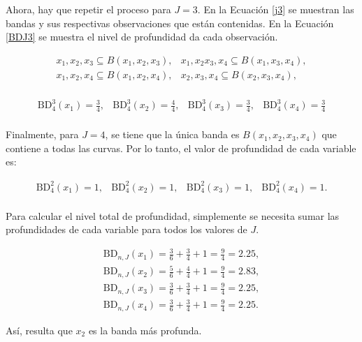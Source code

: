 \begin{ejemplo}
Ahora, hay que repetir el proceso para $J = 3$. En la Ecuación \eqref{j3} se muestran las bandas y sus respectivas observaciones que están contenidas. En la Ecuación \eqref{BDJ3} se muestra el nivel de profundidad da cada observación.

\begin{equation}\label{j3}
    \begin{matrix}
        x_1, x_2, x_3 \subseteq B(x_1, x_2, x_3), & x_1, x_2 x_3, x_4 \subseteq B(x_1, x_3, x_4), \\
        x_1, x_2, x_4 \subseteq B(x_1, x_2, x_4), & x_2, x_3, x_4 \subseteq B(x_2, x_3, x_4), \\
    \end{matrix}
\end{equation}

\begin{equation}\label{BDJ3}
    \begin{matrix}
        \mathrm{BD}^{3}_4(x_1) = \frac{3}{4}, & \mathrm{BD}^{3}_4(x_2) = \frac{4}{4},  & \mathrm{BD}^{3}_4(x_3) = \frac{3}{4},  & \mathrm{BD}^{3}_4(x_4) = \frac{3}{4} \\
    \end{matrix} 
\end{equation}

Finalmente, para $J = 4$, se tiene que la única banda es $B(x_1, x_2, x_3, x_4)$ que contiene a todas las curvas. Por lo tanto, el valor de profundidad de cada variable es:

\begin{equation}
    \begin{matrix}
            \mathrm{BD}^{2}_4(x_1) = 1, & \mathrm{BD}^{2}_4 (x_2) = 1,  & \mathrm{BD}^{2}_4(x_3) = 1,  & \mathrm{BD}^{2}_4(x_4) = 1. \\
        \end{matrix}    
\end{equation}

Para calcular el nivel total de profundidad, simplemente se necesita sumar las profundidades de cada variable para todos los valores de $J$.

\begin{equation}
    \begin{matrix}
\mathrm{BD}_{n, J}(x_1) = \frac{3}{6} + \frac{3}{4} + 1 = \frac{9}{4} = 2.25, \\
\mathrm{BD}_{n, J}(x_2) = \frac{5}{6} + \frac{4}{4} + 1 = \frac{9}{4} = 2.83, \\
\mathrm{BD}_{n, J}(x_3) = \frac{3}{6} + \frac{3}{4} + 1 = \frac{9}{4} = 2.25, \\
\mathrm{BD}_{n, J}(x_4) = \frac{3}{6} + \frac{3}{4} + 1 = \frac{9}{4} = 2.25.
\end{matrix}
\end{equation}

Así, resulta que $x_2$ es la banda más profunda.

\end{ejemplo}

